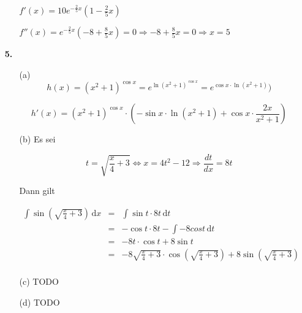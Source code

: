 \documentclass[a4paper,11pt,fleqn]{scrartcl}
\newcommand{\bra}[1]{\left(#1\right)}
\newcommand{\dX}[1]{\, \mathrm{d}#1}
\newcommand{\dx}[0]{\dX{x}}
\newcommand{\dt}[0]{\dX{t}}
\begin{document}
\begin{enumerate}
\begin{enumerate}

                \( f'(x) = 10 e^{-\frac{2}{5}x} \bra{1 - \frac{2}{5}x} \)

                \( f''(x) = e^{-\frac{2}{5}x} \bra{-8 + \frac{8}{5}x} = 0 \Rightarrow -8 + \frac{8}{5}x = 0 \Rightarrow x = 5 \)


        \end{enumerate}
    \item[\textbf{5.}]
        \begin{enumerate}
            \item[(a)]
                \[ h(x) = \bra{x^2+1}^{\cos x} = e^{\ln \bra{x^2+1}^{\cos x}} = e^{\cos x \cdot \ln \bra{x^2+1}}) \]

                \[ h'(x) = \bra{x^2+1}^{\cos x} \cdot \bra{ -\sin x \cdot \ln \bra{x^2+1} + \cos x \cdot \frac{2x}{x^2+1} } \]

            \item[(b)]
                Es sei

                \[ t = \sqrt{\frac{x}{4} + 3} \Leftrightarrow x = 4t^2-12 \Rightarrow \frac{dt}{dx} = 8t  \]

                Dann gilt

                \begin{eqnarray*}
                    \int \sin\bra{\sqrt{\frac{x}{4} + 3}} \dx &=& \int \sin t \cdot 8t \dt\\
                    &=& - \cos t \cdot 8t - \int -8 cos t \dt \\
                    &=& -8t \cdot \cos t + 8 \sin t\\
                    &=& -8 \sqrt{\frac{x}{4} + 3} \cdot \cos \bra{\sqrt{\frac{x}{4} + 3}} + 8 \sin \bra{\sqrt{\frac{x}{4} + 3}}\\
                \end{eqnarray*}



            \item[(c)]
                TODO

            \item[(d)]
                TODO
        \end{enumerate}
\end{enumerate}
\end{document}
